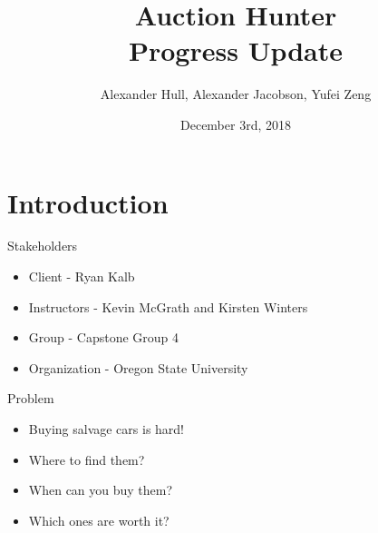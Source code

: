 \documentclass{beamer}
\title[Your Short Title]{Auction Hunter \\ Progress Update}
\author{Alexander Hull, Alexander Jacobson, Yufei Zeng}
\institute{CS 461 - Fall 2018}
\date{December 3rd, 2018}
\begin{document}
\begin{frame}
  \titlepage
\end{frame}




\section{Introduction}

\begin{frame}{Stakeholders}
\begin{itemize}
  \setlength\itemsep{2em}
  \item Client - Ryan Kalb
  \item Instructors - Kevin McGrath and Kirsten Winters
  \item Group - Capstone Group 4 
  \item Organization - Oregon State University 
  
\end{itemize}
\end{frame}


\begin{frame}{Problem}
\begin{itemize}
    \setlength\itemsep{2em}
    \item Buying salvage cars is hard!
    \item Where to find them?
    \item When can you buy them?
    \item Which ones are worth it?
\end{itemize}
\end{frame}
\end{document}
